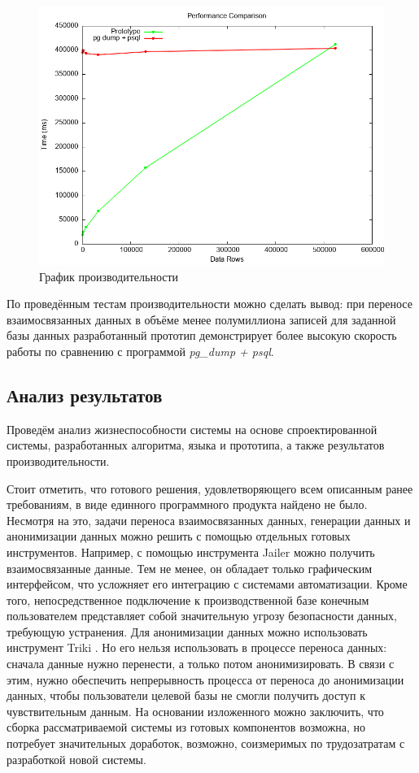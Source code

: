 \begin{figure}
  \includegraphics[scale=0.75]{./img/benchmark.png}
  \caption{График производительности}
  \label{benchmark}
\end{figure}

По проведённым тестам производительности можно сделать вывод: при переносе взаимосвязанных данных в объёме менее полумиллиона записей для заданной базы данных разработанный прототип демонстрирует более высокую скорость работы по сравнению с программой \textit{pg\_dump + psql}.

\subsection{Анализ результатов}

Проведём анализ жизнеспособности системы на основе спроектированной системы, разработанных алгоритма, языка и прототипа, а также результатов производительности.

Стоит отметить, что готового решения, удовлетворяющего всем описанным ранее требованиям, в виде единного программного продукта найдено не было. Несмотря на это, задачи переноса взаимосвязанных данных, генерации данных и анонимизации данных можно решить с помощью отдельных готовых инструментов. Например, с помощью инструмента Jailer \cite{jailer} можно получить взаимосвязанные данные. Тем не менее, он обладает только графическим интерфейсом, что усложняет его интеграцию с системами автоматизации. Кроме того, непосредственное подключение к производственной базе конечным пользователем представляет собой значительную угрозу безопасности данных, требующую устранения. Для анонимизации данных можно использовать инструмент Triki \cite{triki}. Но его нельзя использовать в процессе переноса данных: сначала данные нужно перенести, а только потом анонимизировать. В связи с этим, нужно обеспечить непрерывность процесса от переноса до анонимизации данных, чтобы пользователи целевой базы не смогли получить доступ к чувствительным данным. На основании изложенного можно заключить, что сборка рассматриваемой системы из готовых компонентов возможна, но потребует значительных доработок, возможно, соизмеримых по трудозатратам с разработкой новой системы.

